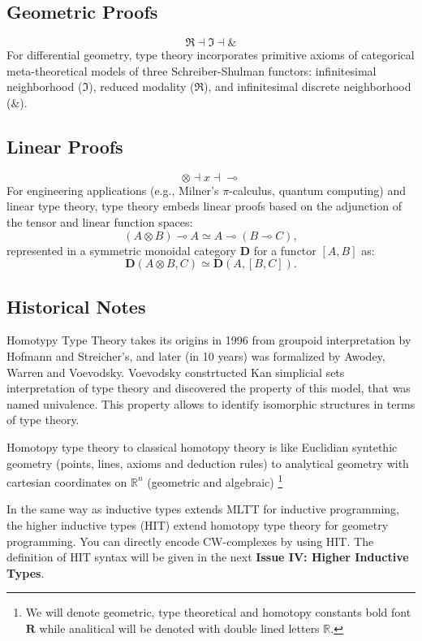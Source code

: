 \documentclass{article}
\begin{document}
\subsection{Geometric Proofs}
\[
\Re \dashv \Im \dashv \&
\]
For differential geometry, type theory incorporates primitive axioms of categorical meta-theoretical models of three Schreiber-Shulman functors: infinitesimal neighborhood (\(\Im\)), reduced modality (\(\Re\)), and infinitesimal discrete neighborhood (\(\&\)).

\subsection{Linear Proofs}
\[
\otimes \dashv x \dashv \multimap
\]
For engineering applications (e.g., Milner's \(\pi\)-calculus, quantum computing) and linear type theory, type theory embeds linear proofs based on the adjunction of the tensor and linear function spaces:
\[
(A \otimes B) \multimap A \simeq A \multimap (B \multimap C),
\]
represented in a symmetric monoidal category \(\mathbf{D}\) for a functor \([A,B]\) as:
\[
\mathbf{D}(A \otimes B, C) \simeq \mathbf{D}(A, [B,C]).
\]

\subsection{Historical Notes}
Homotypy Type Theory takes its origins in 1996 from groupoid interpretation by
Hofmann and Streicher's, and later (in 10 years) was formalized by Awodey,
Warren and Voevodsky. Voevodsky constrtucted Kan simplicial sets interpretation
of type theory and discovered the property of this model, that was named univalence.
This property allows to identify isomorphic structures in terms of type theory.

Homotopy type theory to classical homotopy theory is like Euclidian
syntethic geometry (points, lines, axioms and deduction rules) to
analytical geometry with cartesian coordinates on $\mathbb{R}^n$ (geometric and algebraic)
\footnote{We will denote geometric, type theoretical and homotopy constants
bold font $\mathbf{R}$ while analitical will be denoted with double lined letters $\mathbb{R}$.}

In the same way as inductive types extends MLTT for inductive programming,
the higher inductive types (HIT) extend homotopy type theory for geometry programming.
You can directly encode CW-complexes by using HIT. The definition of HIT syntax will
be given in the next {\bf Issue IV: Higher Inductive Types}.
\end{document}
